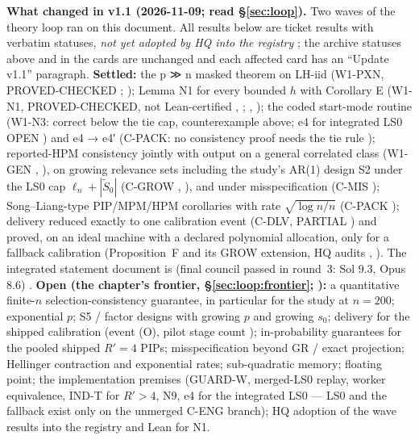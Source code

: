 \textbf{What changed in v1.1 (2026-11-09; read \S\ref{sec:loop}).} Two waves of the theory loop ran on this document. All results below are ticket results with verbatim statuses, \emph{not yet adopted by HQ into the registry} ; the archive statuses above and in the cards are unchanged and each affected card has an ``Update v1.1'' paragraph. \textbf{Settled:} the p ≫ n masked theorem on LH-iid (W1-PXN, PROVED-CHECKED ; ); Lemma N1 for every bounded $h$ with Corollary E (W1-N1, PROVED-CHECKED, not Lean-certified , ; , ); the coded start-mode routine (W1-N3: correct below the tie cap, counterexample above; e4 for integrated LS0 OPEN ) and e4 → e4′ (C-PACK: no consistency proof needs the tie rule ); reported-HPM consistency jointly with output on a general correlated class (W1-GEN , ), on growing relevance sets including the study's AR(1) design S2 under the LS0 cap $\ell_n+|\tilde S_0|$ (C-GROW , ), and under misspecification (C-MIS ); Song--Liang-type PIP/MPM/HPM corollaries with rate $\sqrt{\log n/n}$ (C-PACK ); delivery reduced exactly to one calibration event (C-DLV, PARTIAL ) and proved, on an ideal machine with a declared polynomial allocation, only for a fallback calibration (Proposition~F and its GROW extension, HQ audits , ). The integrated statement document is  (final council passed in round~3: Sol 9.3, Opus 8.6) . \textbf{Open (the chapter's frontier, \S\ref{sec:loop:frontier}; ):} a quantitative finite-$n$ selection-consistency guarantee, in particular for the study at $n=200$; exponential $p$; S5 / factor designs with growing $p$ and growing $s_0$; delivery for the shipped calibration (event (O), pilot stage count ); in-probability guarantees for the pooled shipped $R'=4$ PIPs; misspecification beyond GR / exact projection; Hellinger contraction and exponential rates; sub-quadratic memory; floating point; the implementation premises (GUARD-W, merged-LS0 replay, worker equivalence, IND-T for $R'>4$, N9, e4 for the integrated LS0 — LS0 and the fallback exist only on the unmerged C-ENG branch); HQ adoption of the wave results into the registry and Lean for N1.

